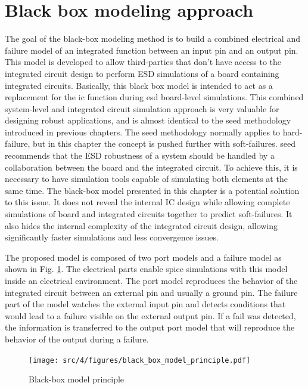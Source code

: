 \section{Black box modeling approach}

The goal of the black-box modeling method is to build a combined electrical and failure model of an integrated function between an input pin and an output pin.
This model is developed to allow third-parties that don't have access to the integrated circuit design to perform ESD simulations of a board containing integrated circuits.
Basically, this black box model is intended to act as a replacement for the \gls{ic} function during \gls{esd} board-level simulations.
This combined system-level and integrated circuit simulation approach is very valuable for designing robust applications, and is almost identical to the \gls{seed} \cite{seed} methodology introduced in previous chapters.
The \gls{seed} methodology normally applies to hard-failure, but in this chapter the concept is pushed further with soft-failures.
\gls{seed} recommends that the ESD robustness of a system should be handled by a collaboration between the board and the integrated circuit.
To achieve this, it is necessary to have simulation tools capable of simulating both elements at the same time.
The black-box model presented in this chapter is a potential solution to this issue.
It does not reveal the internal IC design while allowing complete simulations of board and integrated circuits together to predict soft-failures.
It also hides the internal complexity of the integrated circuit design, allowing significantly faster simulations and less convergence issues.

The proposed model is composed of two port models and a failure model as shown in Fig. \ref{fig:black-box-principle}.
The electrical parts enable \gls{spice} simulations with this model inside an electrical environment.
The port model reproduces the behavior of the integrated circuit between an external pin and usually a ground pin.
The failure part of the model watches the external input pin and detects conditions that would lead to a failure visible on the external output pin.
If a fail was detected, the information is transferred to the output port model that will reproduce the behavior of the output during a failure.

\begin{figure}[!h]
  \centering
  \texttt{[image: src/4/figures/black\_box\_model\_principle.pdf]}
  \caption{Black-box model principle}
  \label{fig:black-box-principle}
\end{figure}

